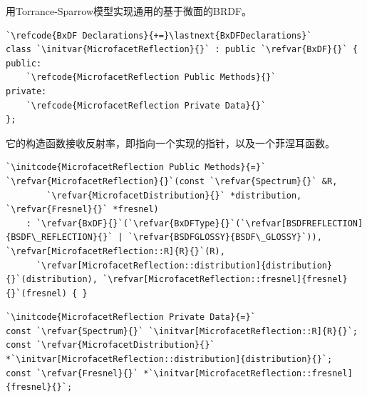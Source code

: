 用Torrance-Sparrow模型实现通用的基于微面的BRDF。
\begin{lstlisting}
`\refcode{BxDF Declarations}{+=}\lastnext{BxDFDeclarations}`
class `\initvar{MicrofacetReflection}{}` : public `\refvar{BxDF}{}` {
public:
    `\refcode{MicrofacetReflection Public Methods}{}`
private:
    `\refcode{MicrofacetReflection Private Data}{}`
};
\end{lstlisting}
它的构造函数接收反射率，即指向一个实现的指针，以及一个菲涅耳函数。
\begin{lstlisting}
`\initcode{MicrofacetReflection Public Methods}{=}`
`\refvar{MicrofacetReflection}{}`(const `\refvar{Spectrum}{}` &R,
        `\refvar{MicrofacetDistribution}{}` *distribution, `\refvar{Fresnel}{}` *fresnel)
    : `\refvar{BxDF}{}`(`\refvar{BxDFType}{}`(`\refvar[BSDFREFLECTION]{BSDF\_REFLECTION}{}` | `\refvar{BSDFGLOSSY}{BSDF\_GLOSSY}`)), `\refvar[MicrofacetReflection::R]{R}{}`(R),
      `\refvar[MicrofacetReflection::distribution]{distribution}{}`(distribution), `\refvar[MicrofacetReflection::fresnel]{fresnel}{}`(fresnel) { }
\end{lstlisting}
\begin{lstlisting}
`\initcode{MicrofacetReflection Private Data}{=}`
const `\refvar{Spectrum}{}` `\initvar[MicrofacetReflection::R]{R}{}`;
const `\refvar{MicrofacetDistribution}{}` *`\initvar[MicrofacetReflection::distribution]{distribution}{}`;
const `\refvar{Fresnel}{}` *`\initvar[MicrofacetReflection::fresnel]{fresnel}{}`;
\end{lstlisting}

